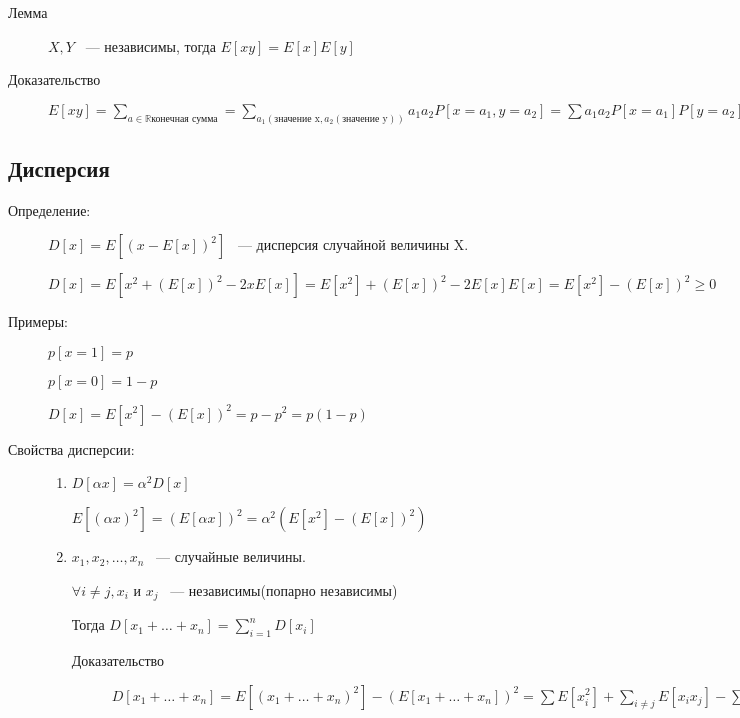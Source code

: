 \documentclass[12pt]{article}
\begin{document}
\begin{description}
\begin{description}
\item[Лемма] $X, Y$ ~--- независимы, тогда $E[xy] = E[x]E[y]$

\item[Доказательство]

$E[xy] = \sum_{a \in \mathbb R \text{конечная сумма}} = \sum_{a_1(\text{значение x}, a_2(\text{значение y}))} a_1 a_2 P[x = a_1, y = a_2] = \sum a_1 a_2 P[x = a_1]P[y = a_2] = (\sum a_1 P[x = a_1])(\sum a_2 P[y = a_2]) = E[x] E[y]$
\end{description}

\subsection{Дисперсия}

\begin{description}

\item[Определение:] $D[x] = E[(x - E[x])^2]$ ~--- дисперсия случайной величины X.

$D[x] = E[x^2 + (E[x])^2 - 2xE[x]] = E[x^2] + (E[x])^2 - 2E[x]E[x] = E[x^2] - (E[x])^2 \ge 0$

\item[Примеры:] 

$p[x = 1] = p$

$p[x = 0] = 1 - p$

$D[x] = E[x^2] - (E[x])^2 = p - p^2 = p(1 - p)$

\item[Свойства дисперсии:]
\begin{enumerate}
\item $D[\alpha x] = \alpha^2D[x]$

$E[(\alpha x)^2] = (E[\alpha x])^2 = \alpha^2(E[x^2] - (E[x])^2)$

\item $x_1, x_2, \ldots, x_n$ ~--- случайные величины.

$\forall i \ne j, x_i$ и $x_j$ ~--- независимы(попарно независимы)

Тогда $D[x_1 + \ldots + x_n] = \sum_{i = 1}^{n} D[x_i]$
\begin{description}
\item [Доказательство]

$D[x_1 + \ldots + x_n] = E[(x_1 + \ldots + x_n)^2] - (E[x_1 + \ldots + x_n])^2 = \sum E[x_i^2] + \sum_{i \ne j}E[x_i x_j] - \sum(E[x_i])^2 - \sum_{i \ne j}E[x_i]E[x_j] = \sum_{i = 1}^{n}E[x_i^2] - (E[x_i])^2 = \sum_{i = 1}^nD[x_i]$
\end{description}
\end{enumerate}


\end{description}
\end{description}
\end{document}
